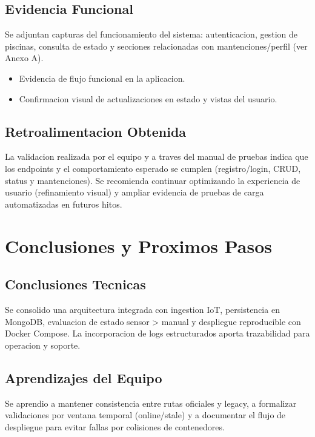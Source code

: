 \documentclass[11pt, a4paper]{article}
\begin{document}
\subsection{Evidencia Funcional}
Se adjuntan capturas del funcionamiento del sistema: autenticacion, gestion de piscinas, consulta de estado y secciones relacionadas con mantenciones/perfil (ver Anexo A).
\begin{itemize}
  \item Evidencia de flujo funcional en la aplicacion.
  \item Confirmacion visual de actualizaciones en estado y vistas del usuario.
\end{itemize}

\subsection{Retroalimentacion Obtenida}
La validacion realizada por el equipo y a traves del manual de pruebas indica que los endpoints y el comportamiento esperado se cumplen (registro/login, CRUD, status y mantenciones). Se recomienda continuar optimizando la experiencia de usuario (refinamiento visual) y ampliar evidencia de pruebas de carga automatizadas en futuros hitos.

\section{Conclusiones y Proximos Pasos}

\subsection{Conclusiones Tecnicas}
Se consolido una arquitectura integrada con ingestion IoT, persistencia en MongoDB, evaluacion de estado sensor > manual y despliegue reproducible con Docker Compose. La incorporacion de logs estructurados aporta trazabilidad para operacion y soporte.

\subsection{Aprendizajes del Equipo}
Se aprendio a mantener consistencia entre rutas oficiales y legacy, a formalizar validaciones por ventana temporal (online/stale) y a documentar el flujo de despliegue para evitar fallas por colisiones de contenedores.
\end{document}
